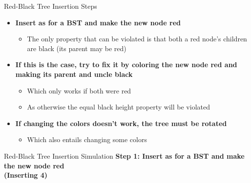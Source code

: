 \documentclass{beamer}
\begin{document}
\begin{frame}{Red-Black Tree Insertion Steps}
\begin{itemize}
    \item[\textbullet] \textbf{Insert as for a BST and make the new node red}
    \begin{itemize}
        \item The only property that can be violated is that both a red node’s children are black (its parent may be red)
    \end{itemize}
    \item[\textbullet] \textbf{If this is the case, try to fix it by coloring the new node red and making its parent and uncle black}
    \begin{itemize}
        \item Which only works if both were red
        \item As otherwise the equal black height property will be violated
    \end{itemize}
    \item[\textbullet] \textbf{If changing the colors doesn’t work, the tree must be rotated}
    \begin{itemize}
        \item Which also entails changing some colors
    \end{itemize}
\end{itemize}
\end{frame}


\begin{frame}{Red-Black Tree Insertion Simulation}
\textbf{Step 1: Insert as for a BST and make the new node red \\(Inserting 4)}
\begin{center}
\end{center}
\end{frame}
\end{document}
